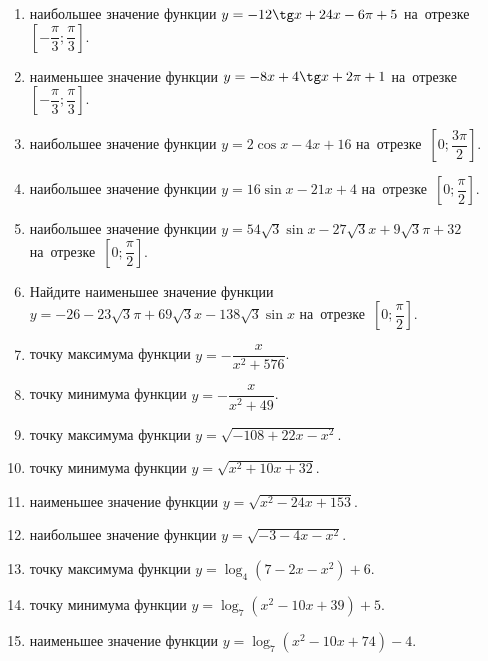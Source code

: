 \documentclass[a4paper,10pt]{article}
\begin{document}
\begin{enumerate}
\item {} наибольшее значение функции $y=-12\tg x +24x-6\pi +5$ на~отрезке~$\left[-\dfrac{\pi}{3};\dfrac{\pi}{3}\right]$.

\item {} наименьшее значение функции $y=-8x +4\tg x+2\pi+1$ на~отрезке~$\left[-\dfrac{\pi}{3};\dfrac{\pi}{3}\right]$.

\item {} наибольшее значение функции $y=2\cos x-4x+16$ на~отрезке~$\left[0;\dfrac{3\pi}{2}\right]$.

\item {} наибольшее значение функции $y=16\sin x-21x+4$ на~отрезке~$\left[0;\dfrac{\pi}{2}\right]$.

\item {} наибольшее значение функции $y=54\sqrt{3}\sin x-27\sqrt{3}x+9\sqrt{3}\pi +32$ на~отрезке~$\left[0;\dfrac{\pi}{2}\right]$.

\item Найдите наименьшее значение функции $y=-26-23\sqrt{3}\pi+69\sqrt{3}x-138\sqrt{3}\sin x$ на~отрезке~$\left[0;\dfrac{\pi}{2}\right]$.

\item {} точку максимума функции $y=-\dfrac{x}{ x^2 +576}$.

\item {} точку минимума функции $y=-\dfrac{x}{ x^2 +49}$.

\item {} точку максимума функции $y=\sqrt{-108+22x-x^2}$.

\item {} точку минимума функции $y=\sqrt{x^2+10x+32}$.

\item {} наименьшее значение функции $y=\sqrt{x^2-24x+153}$.

\item {} наибольшее значение функции $y=\sqrt{-3-4x-x^2}$.

\item {} точку максимума функции $y=\log_4\left(7-2x-x^2\right)+6$.

\item {} точку минимума функции $y=\log_7\left(x^2-10x+39\right)+5$.

\item {} наименьшее значение функции $y=\log_7\left(x^2-10x+74\right)-4$.


\end{enumerate}
\end{document}
